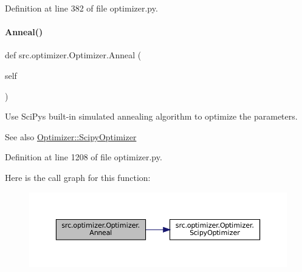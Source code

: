 Definition at line 382 of file optimizer.\+py.

\mbox{\label{classsrc_1_1optimizer_1_1Optimizer_a6a7b8b8996d2b054d0cfa24c88e7d0f4}} 
\paragraph{\texorpdfstring{Anneal()}{Anneal()}}
{\footnotesize\ttfamily def src.\+optimizer.\+Optimizer.\+Anneal (\begin{DoxyParamCaption}\item[{}]{self }\end{DoxyParamCaption})}



Use Sci\+Py\textquotesingle{}s built-\/in simulated annealing algorithm to optimize the parameters. 

\begin{DoxySeeAlso}{See also}
\hyperlink{classsrc_1_1optimizer_1_1Optimizer_a1e616a4c920b3e8935ca19e208b1c3be}{Optimizer\+::\+Scipy\+Optimizer} 
\end{DoxySeeAlso}


Definition at line 1208 of file optimizer.\+py.

Here is the call graph for this function\+:
\nopagebreak
\begin{figure}[H]
\begin{center}
\leavevmode
\includegraphics[width=350pt]{classsrc_1_1optimizer_1_1Optimizer_a6a7b8b8996d2b054d0cfa24c88e7d0f4_cgraph}
\end{center}
\end{figure}
\mbox{\label{classsrc_1_1optimizer_1_1Optimizer_a5ba1a8a4ea6dd488697e647b8aa2228a}} 
